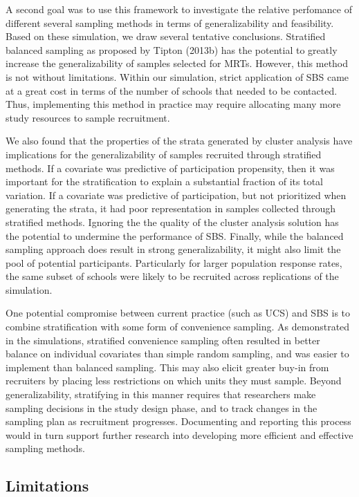 \documentclass[english,man,floatsintext]{apa6}
\begin{document}
A second goal was to use this framework to investigate the relative perfomance of different several sampling methods in terms of generalizability and feasibility. Based on these simulation, we draw several tentative conclusions. Stratified balanced sampling as proposed by Tipton (2013b) has the potential to greatly increase the generalizability of samples selected for MRTs. However, this method is not without limitations. Within our simulation, strict application of SBS came at a great cost in terms of the number of schools that needed to be contacted. Thus, implementing this method in practice may require allocating many more study resources to sample recruitment.

We also found that the properties of the strata generated by cluster analysis have implications for the generalizability of samples recruited through stratified methods. If a covariate was predictive of participation propensity, then it was important for the stratification to explain a substantial fraction of its total variation. If a covariate was predictive of participation, but not prioritized when generating the strata, it had poor representation in samples collected through stratified methods. Ignoring the the quality of the cluster analysis solution has the potential to undermine the performance of SBS. Finally, while the balanced sampling approach does result in strong generalizability, it might also limit the pool of potential participants. Particularly for larger population response rates, the same subset of schools were likely to be recruited across replications of the simulation.

One potential compromise between current practice (such as UCS) and SBS is to combine stratification with some form of convenience sampling. As demonstrated in the simulations, stratified convenience sampling often resulted in better balance on individual covariates than simple random sampling, and was easier to implement than balanced sampling. This may also elicit greater buy-in from recruiters by placing less restrictions on which units they must sample.
Beyond generalizability, stratifying in this manner requires that researchers make sampling decisions in the study design phase, and to track changes in the sampling plan as recruitment progresses. Documenting and reporting this process would in turn support further research into developing more efficient and effective sampling methods.

\hypertarget{limitations}{%
\subsection{Limitations}\label{limitations}}
\end{document}
